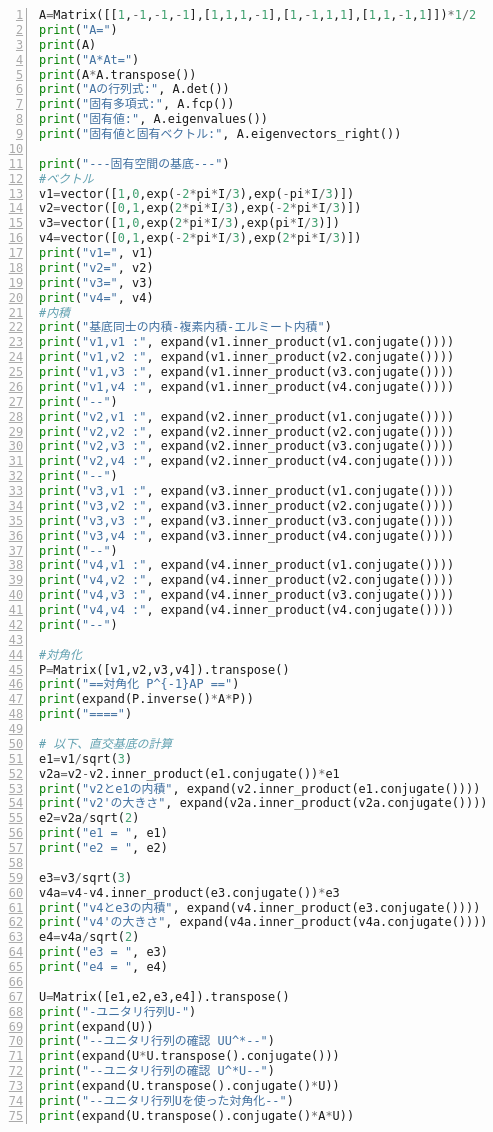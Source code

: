 \documentclass[10pt,b5paper]{ltjsarticle}
\begin{document}
\begin{lstlisting}[language=Python,basicstyle={\small},frame=single,numbers=left]
A=Matrix([[1,-1,-1,-1],[1,1,1,-1],[1,-1,1,1],[1,1,-1,1]])*1/2
print("A=")
print(A)
print("A*At=")
print(A*A.transpose())
print("Aの行列式:", A.det())
print("固有多項式:", A.fcp())
print("固有値:", A.eigenvalues())
print("固有値と固有ベクトル:", A.eigenvectors_right())

print("---固有空間の基底---")
#ベクトル
v1=vector([1,0,exp(-2*pi*I/3),exp(-pi*I/3)])
v2=vector([0,1,exp(2*pi*I/3),exp(-2*pi*I/3)])
v3=vector([1,0,exp(2*pi*I/3),exp(pi*I/3)])
v4=vector([0,1,exp(-2*pi*I/3),exp(2*pi*I/3)])
print("v1=", v1)
print("v2=", v2)
print("v3=", v3)
print("v4=", v4)
#内積
print("基底同士の内積-複素内積-エルミート内積")
print("v1,v1 :", expand(v1.inner_product(v1.conjugate())))
print("v1,v2 :", expand(v1.inner_product(v2.conjugate())))
print("v1,v3 :", expand(v1.inner_product(v3.conjugate())))
print("v1,v4 :", expand(v1.inner_product(v4.conjugate())))
print("--")
print("v2,v1 :", expand(v2.inner_product(v1.conjugate())))
print("v2,v2 :", expand(v2.inner_product(v2.conjugate())))
print("v2,v3 :", expand(v2.inner_product(v3.conjugate())))
print("v2,v4 :", expand(v2.inner_product(v4.conjugate())))
print("--")
print("v3,v1 :", expand(v3.inner_product(v1.conjugate())))
print("v3,v2 :", expand(v3.inner_product(v2.conjugate())))
print("v3,v3 :", expand(v3.inner_product(v3.conjugate())))
print("v3,v4 :", expand(v3.inner_product(v4.conjugate())))
print("--")
print("v4,v1 :", expand(v4.inner_product(v1.conjugate())))
print("v4,v2 :", expand(v4.inner_product(v2.conjugate())))
print("v4,v3 :", expand(v4.inner_product(v3.conjugate())))
print("v4,v4 :", expand(v4.inner_product(v4.conjugate())))
print("--")

#対角化
P=Matrix([v1,v2,v3,v4]).transpose()
print("==対角化 P^{-1}AP ==")
print(expand(P.inverse()*A*P))
print("====")

# 以下、直交基底の計算
e1=v1/sqrt(3)
v2a=v2-v2.inner_product(e1.conjugate())*e1
print("v2とe1の内積", expand(v2.inner_product(e1.conjugate())))
print("v2'の大きさ", expand(v2a.inner_product(v2a.conjugate())))
e2=v2a/sqrt(2)
print("e1 = ", e1)
print("e2 = ", e2)

e3=v3/sqrt(3)
v4a=v4-v4.inner_product(e3.conjugate())*e3
print("v4とe3の内積", expand(v4.inner_product(e3.conjugate())))
print("v4'の大きさ", expand(v4a.inner_product(v4a.conjugate())))
e4=v4a/sqrt(2)
print("e3 = ", e3)
print("e4 = ", e4)

U=Matrix([e1,e2,e3,e4]).transpose()
print("-ユニタリ行列U-")
print(expand(U))
print("--ユニタリ行列の確認 UU^*--")
print(expand(U*U.transpose().conjugate()))
print("--ユニタリ行列の確認 U^*U--")
print(expand(U.transpose().conjugate()*U))
print("--ユニタリ行列Uを使った対角化--")
print(expand(U.transpose().conjugate()*A*U))
\end{lstlisting}
\end{document}
